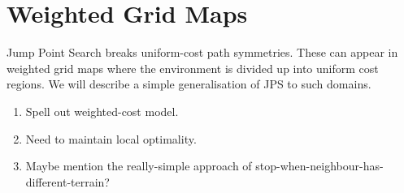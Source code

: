 \section{Weighted Grid Maps}
Jump Point Search breaks uniform-cost path symmetries. These can appear
in weighted grid maps where the environment is divided up into uniform
cost regions.
We will describe a simple generalisation of JPS to such domains.
\begin{enumerate}
\item{Spell out weighted-cost model.}
\item{Need to maintain local optimality.}
\item{Maybe mention the really-simple approach of stop-when-neighbour-has-different-terrain?}
\end{enumerate}
